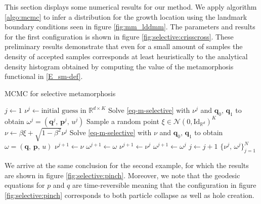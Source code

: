 \documentclass[runningheads]{llncs}
\newcommand{\RdK}{\mathbb{R}^{d\times K}}
\begin{document}
This section displays some numerical results for our method. We apply algorithm
\ref{algo:mcmc} to infer a distribution for the growth location using the
landmark boundary conditions seen in figure \ref{fig:mm_lddmm}.  The parameters
and results for the first configuration is shown in figure
\ref{fig:selective:crisscross}. These preliminary results demonstrate that even
for a small amount of samples the density of accepted samples corresponds at
least heuristically to the analytical density histogram obtained by computing
the value of the metamorphosis functional in \eqref{E_sm-def}.
\begin{algorithm}[h!]
\begin{algorithmic}
\caption{MCMC for selective metamorphosis}\label{algo:mcmc}
\Procedure{mcmcSM}{$N$, $K$, $\mathbf q_0$, $\mathbf q_1$, $\beta\in (0,1]$}
\State $j \gets 1$
\State $\nu^j \gets \text{initial guess in } \RdK$
\State Solve \eqref{eq-m-selective} with $\nu^j$ and $\mathbf q_0,\,\mathbf q_1$
to obtain $\omega^j = (\mathbf q^j,\,\mathbf p^j,\, u^j)$
\State Sample a random point $\xi \in \mathcal N(0, \text{Id}_{\mathbb R^d})^K$
\State $\nu \gets \beta \xi + \sqrt{1-\beta^2} \nu^j$
\State Solve \eqref{eq-m-selective} with $\nu$ and $\mathbf q_0,\,\mathbf q_1$
to obtain $\omega = (\mathbf q,\, \mathbf p,\, u)$
    \State $\nu^{j+1} \gets \nu$
    \State $\omega^{j+1} \gets \omega$
\Else
    \State $\nu^{j+1} \gets \nu^j$
    \State $\omega^{j+1} \gets \omega^j$
\EndIf
\State $j\gets j+1$
\EndWhile
\Return $\{\nu^j,\, \omega^j\}_{j=1}^N$
\EndProcedure
\end{algorithmic}
\end{algorithm}

We arrive at the same conclusion for the second example, for which the results
are shown in figure \eqref{fig:selective:pinch}. Moreover, we note that the
geodesic equations for $p$ and $q$ are time-reversible meaning that the
configuration in figure \ref{fig:selective:pinch} corresponds to both particle
collapse as well as hole creation. 
\end{document}

